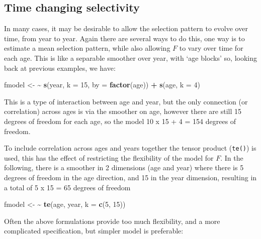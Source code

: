 \documentclass[
]{book}
\newenvironment{Shaded}{\begin{snugshade}}{\end{snugshade}}
\newcommand{\AttributeTok}[1]{\textcolor[rgb]{0.13,0.29,0.53}{#1}}
\newcommand{\DecValTok}[1]{\textcolor[rgb]{0.00,0.00,0.81}{#1}}
\newcommand{\ErrorTok}[1]{\textcolor[rgb]{0.64,0.00,0.00}{\textbf{#1}}}
\newcommand{\FunctionTok}[1]{\textcolor[rgb]{0.13,0.29,0.53}{\textbf{#1}}}
\newcommand{\NormalTok}[1]{#1}
\newcommand{\OtherTok}[1]{\textcolor[rgb]{0.56,0.35,0.01}{#1}}
\newcommand{\SpecialCharTok}[1]{\textcolor[rgb]{0.81,0.36,0.00}{\textbf{#1}}}
\begin{document}
\hypertarget{time-changing-selectivity}{%
\subsection{Time changing selectivity}\label{time-changing-selectivity}}

In many cases, it may be desirable to allow the selection pattern to evolve over time, from year to year. Again there are several ways to do this, one way is to estimate a mean selection pattern, while also allowing \(F\) to vary over time for each age. This is like a separable smoother over year, with `age blocks' so, looking back at previous examples, we have:

\begin{Shaded}
\begin{Highlighting}[]
\NormalTok{fmodel }\OtherTok{\textless{}{-}} \ErrorTok{\textasciitilde{}} \FunctionTok{s}\NormalTok{(year, }\AttributeTok{k =} \DecValTok{15}\NormalTok{, }\AttributeTok{by =} \FunctionTok{factor}\NormalTok{(age)) }\SpecialCharTok{+} \FunctionTok{s}\NormalTok{(age, }\AttributeTok{k =} \DecValTok{4}\NormalTok{)}
\end{Highlighting}
\end{Shaded}

This is a type of interaction between age and year, but the only connection (or correlation) across ages is via the smoother on age, however there are still 15 degrees of freedom for each age, so the model 10 x 15 + 4 = 154 degrees of freedom.

To include correlation across ages and years together the tensor product (\texttt{te()}) is used, this has the effect of restricting the flexibility of the model for \(F\). In the following, there is a smoother in 2 dimensions (age and year) where there is 5 degrees of freedom in the age direction, and 15 in the year dimension, resulting in a total of 5 x 15 = 65 degrees of freedom

\begin{Shaded}
\begin{Highlighting}[]
\NormalTok{fmodel }\OtherTok{\textless{}{-}} \ErrorTok{\textasciitilde{}} \FunctionTok{te}\NormalTok{(age, year, }\AttributeTok{k =} \FunctionTok{c}\NormalTok{(}\DecValTok{5}\NormalTok{, }\DecValTok{15}\NormalTok{))}
\end{Highlighting}
\end{Shaded}

Often the above formulations provide too much flexibility, and a more complicated specification, but simpler model is preferable:
\end{document}
